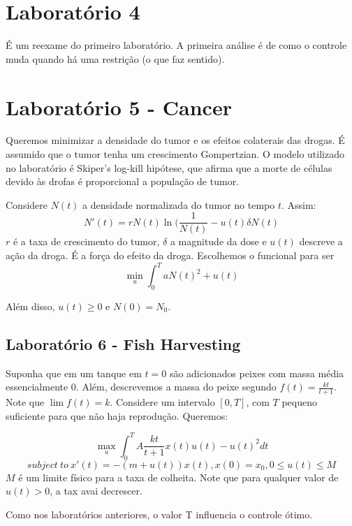 \section{Laboratório 4}

É um reexame do primeiro laboratório. A primeira análise é de como o controle muda quando há uma restrição (o que faz sentido). 

\section{Laboratório 5 - Cancer}

Queremos minimizar a densidade do tumor e os efeitos colaterais das drogas. É assumido que o tumor tenha um crescimento Gompertzian. O modelo utilizado no laboratório é Skiper's log-kill hipótese, que afirma que a morte de células devido às drofas é proporcional a população de tumor. 

Considere $N(t)$ a densidade normalizada do tumor no tempo $t$. Assim:
$$N'(t) = rN(t)\ln(\frac{1}{N(t)} - u(t)\delta N(t)$$
$r$ é a taxa de crescimento do tumor, $\delta$ a magnitude da dose e $u(t)$ descreve a ação da droga. É a força do efeito da droga. Escolhemos o funcional para ser 
$$\min_u \int_0^T aN(t)^2 + u(t)$$

Além disso, $u(t) \geq 0$ e $N(0) = N_0$. 

\subsection{Laboratório 6 - Fish Harvesting}

Suponha que em um tanque em $t = 0$ são adicionados peixes com massa média essencialmente 0. Além, descrevemos a massa do peixe segundo $f(t) = \frac{kt}{t+1}$. Note que $\lim f(t) = k$. Considere um intervalo $[0,T]$, com $T$ pequeno suficiente para que não haja reprodução. Queremos:

$$
\max_u \int_0^T A\frac{kt}{t+1}x(t)u(t) - u(t)^2 dt
$$
$$
subject~to~x'(t) = -(m + u(t))x(t), x(0) = x_0, 0 \leq u(t) \leq M
$$
$M$ é um limite físico para a taxa de colheita. Note que para qualquer valor de $u(t) > 0$, a tax avai decrescer. 

Como nos laboratórios anteriores, o valor T influencia o controle ótimo. 

